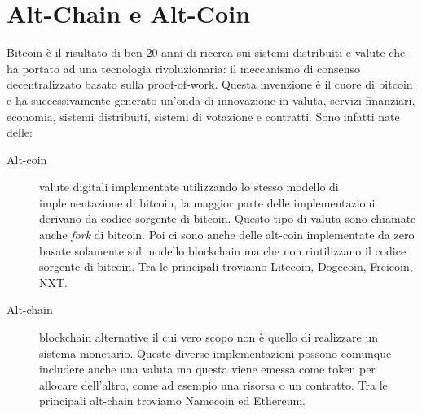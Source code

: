 \section{Alt-Chain e Alt-Coin}
Bitcoin è il risultato di ben 20 anni di ricerca sui sistemi distribuiti e valute che ha portato ad una tecnologia rivoluzionaria: il meccanismo di consenso decentralizzato basato sulla proof-of-work. Questa invenzione è il cuore di bitcoin e ha successivamente generato un'onda di innovazione in valuta, servizi finanziari, economia, sistemi distribuiti, sistemi di votazione e contratti. Sono infatti nate delle:
\begin{description}
	\item[Alt-coin] valute digitali implementate utilizzando lo stesso modello di implementazione di bitcoin, la maggior parte delle implementazioni derivano da codice sorgente di bitcoin. Questo tipo di valuta sono chiamate anche \textit{fork} di bitcoin. Poi ci sono anche delle alt-coin implementate da zero basate solamente sul modello blockchain ma che non riutilizzano il codice sorgente di bitcoin. Tra le principali troviamo Litecoin, Dogecoin, Freicoin, NXT.
	\item[Alt-chain] blockchain alternative il cui vero scopo non è quello di realizzare un sistema monetario. Queste diverse implementazioni possono comunque includere anche una valuta ma questa viene emessa come token per allocare dell'altro, come ad esempio una risorsa o un contratto. Tra le principali alt-chain troviamo Namecoin ed Ethereum.
\end{description}
